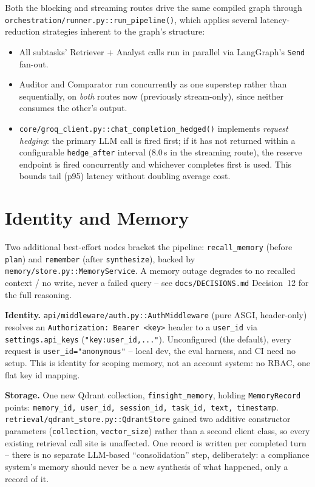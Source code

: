 \documentclass[11pt,a4paper]{report}
\newcommand{\code}[1]{\texttt{#1}}
\newcommand{\file}[1]{\texttt{\small #1}}
\begin{document}
Both the blocking and streaming routes drive the same compiled graph through
\file{orchestration/runner.py}\code{::run\_pipeline()}, which applies several
latency-reduction strategies inherent to the graph's structure:

\begin{itemize}
    \item All subtasks' Retriever + Analyst calls run in parallel via LangGraph's
    \code{Send} fan-out.
    \item Auditor and Comparator run concurrently as one superstep rather than
    sequentially, on \emph{both} routes now (previously stream-only), since neither
    consumes the other's output.
    \item \code{core/groq\_client.py}\code{::chat\_completion\_hedged()} implements
    \emph{request hedging}: the primary LLM call is fired first; if it has not
    returned within a configurable \code{hedge\_after} interval (8.0\,s in the
    streaming route), the reserve endpoint is fired concurrently and whichever
    completes first is used. This bounds tail (p95) latency without doubling average
    cost.
\end{itemize}

\section{Identity and Memory}
\label{sec:identity-memory}

Two additional best-effort nodes bracket the pipeline: \code{recall\_memory}
(before \code{plan}) and \code{remember} (after \code{synthesize}), backed by
\file{memory/store.py}\code{::MemoryService}. A memory outage degrades to no
recalled context / no write, never a failed query -- see
\file{docs/DECISIONS.md} Decision~12 for the full reasoning.

\textbf{Identity.} \file{api/middleware/auth.py}\code{::AuthMiddleware} (pure
ASGI, header-only) resolves an \code{Authorization: Bearer <key>} header to a
\code{user\_id} via \code{settings.api\_keys} (\code{"key:user\_id,..."}).
Unconfigured (the default), every request is \code{user\_id="anonymous"} --
local dev, the eval harness, and CI need no setup. This is identity for
scoping memory, not an account system: no RBAC, one flat key\,\textrightarrow\,id
mapping.

\textbf{Storage.} One new Qdrant collection, \code{finsight\_memory}, holding
\code{MemoryRecord} points: \code{memory\_id, user\_id, session\_id, task\_id,
text, timestamp}. \file{retrieval/qdrant\_store.py}\code{::QdrantStore} gained
two additive constructor parameters (\code{collection}, \code{vector\_size})
rather than a second client class, so every existing retrieval call site is
unaffected. One record is written per completed turn -- there is no separate
LLM-based ``consolidation'' step, deliberately: a compliance system's memory
should never be a new synthesis of what happened, only a record of it.
\end{document}
